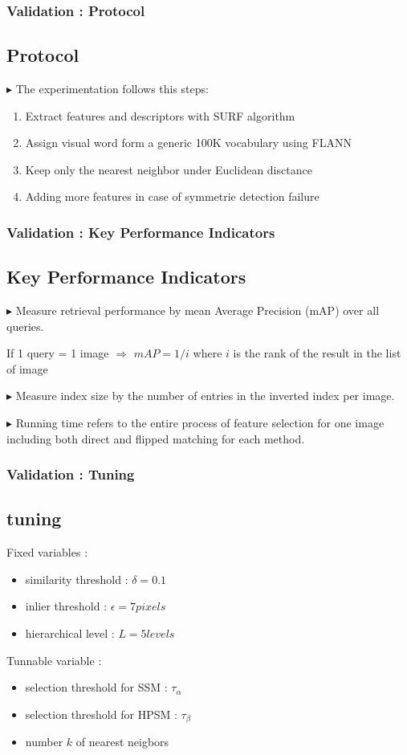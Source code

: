 \documentclass[11pt]{beamer}
\begin{document}
\begin{frame}
\frametitle{Validation : Protocol}
\subsection{Protocol}
$\blacktriangleright$ The experimentation follows this steps:
\begin{enumerate}
\item Extract features and descriptors with SURF algorithm
\item Assign visual word form a generic 100K vocabulary using FLANN
\item Keep only the nearest neighbor under Euclidean disctance
\item Adding more features in case of symmetrie detection failure 
\end{enumerate}
\end{frame}

\begin{frame}
\frametitle{Validation : Key Performance Indicators}
\subsection{Key Performance Indicators}
$\blacktriangleright$ Measure retrieval performance by mean Average Precision (mAP) over all queries.

\vspace{0.3cm}
If 1 query = 1 image $\Rightarrow$ $mAP = 1/i$ where $i$ is the rank of the result in the list of image

\vspace{0.3cm}
$\blacktriangleright$ Measure index size by the number of entries in the inverted index per image.

\vspace{0.3cm}
$\blacktriangleright$ Running time refers to the entire process of feature selection for one image including both direct and flipped matching for each method.
\end{frame}

\begin{frame}
\frametitle{Validation : Tuning}
\subsection{tuning}
Fixed variables :
\begin{itemize}
\item similarity threshold : $\delta = 0.1$
\item inlier threshold : $\epsilon = 7 pixels$
\item hierarchical level : $L = 5 levels$
\end{itemize}

Tunnable variable :
\begin{itemize}
\item selection threshold for SSM : $\tau_\alpha$
\item selection threshold for HPSM : $\tau_\beta$
\item number $k$ of nearest neigbors
\end{itemize}

\end{frame}
\end{document}
